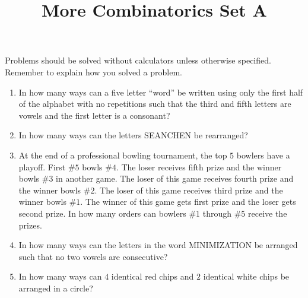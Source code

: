 \documentclass{article}
\title{More Combinatorics Set A}
\date{}
\author{}
\begin{document}
\maketitle
\noindent Problems should be solved without calculators unless otherwise 
specified. Remember to explain how you solved a problem.
\begin{enumerate}
    \item In how many ways can a five letter ``word'' be written using only 
        the first half of the alphabet with no repetitions such that the 
        third and fifth letters are vowels and the first letter is a 
        consonant?
        \vspace{3cm}
    \item In how many ways can the letters SEANCHEN be rearranged?
        \vspace{3cm}
    \item At the end of a professional bowling tournament, the top $5$ bowlers have a 
        playoff. First \#$5$ bowls \#$4$. The loser receives fifth prize and the winner 
        bowls \#$3$ in another game. The loser of this game receives fourth prize and the 
        winner bowls \#$2$. The loser of this game receives third prize and the winner bowls 
        \#$1$. The winner of this game gets first prize and the loser gets second prize. 
        In how many orders can bowlers \#$1$ through \#$5$ receive the prizes.
        \vspace{3cm}
    \item In how many ways can the letters in the word MINIMIZATION be arranged 
        such that no two vowels are consecutive?
        \vspace{3cm}
    \item In how many ways can $4$ identical red chips and $2$ identical white chips be 
        arranged in a circle?
        \vspace{3cm}
\end{enumerate}
\end{document}

